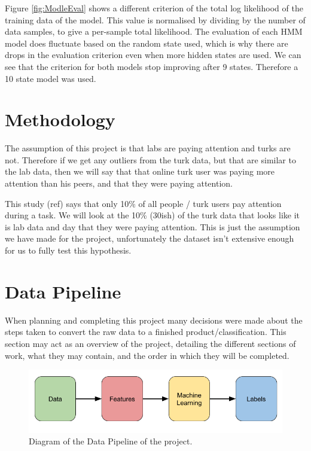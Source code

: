 \documentclass{article}
\begin{document}
Figure \ref{fig:ModleEval} shows a different criterion of the total log likelihood of the training data of the model.
This value is normalised by dividing by the number of data samples, to give a per-sample total likelihood.
The evaluation of each HMM model does fluctuate based on the random state used, which is why there are drops in the evaluation criterion even when more hidden states are used.
We can see that the criterion for both models stop improving after 9 states.
Therefore a 10 state model was used.


\section{Methodology}

 The assumption of this project is that labs are paying attention and turks are not. Therefore if we get any outliers from the turk data, but that are similar to the lab data, then we will say that that online turk user was paying more attention than his peers, and that they were paying attention.

This study (ref) says that only 10\% of all people / turk users pay attention during a task.
We will look at the 10\% (30ish) of the turk data that looks like it is lab data and day that they were paying attention.
This is just the assumption we have made for the project, 
unfortunately the dataset isn't extensive enough for us to fully test this hypothesis.

\section{Data Pipeline}

When planning and completing this project many decisions were made about the steps taken to convert the raw data to a finished product/classification.
This section may act as an overview of the project, detailing the different sections of work, what they may contain, and the order in which they will be completed.

\begin{figure}[ht]
    \centering
    \includegraphics[scale=0.5]{Images/Data-Pipeline.png}
    \caption{Diagram of the Data Pipeline of the project.}
    \label{fig:test}
\end{figure}
\end{document}
